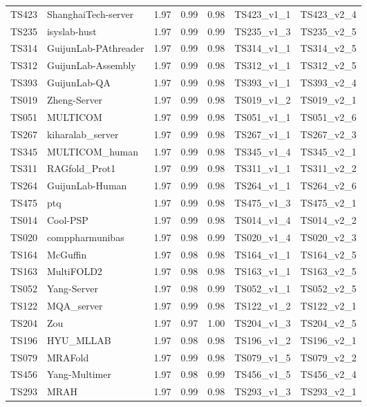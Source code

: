 \begin{table}[ht]
{\begin{tabular}{llrrrll}
TS423 & ShanghaiTech-server & 1.97 & 0.99 & 0.98 & TS423\_v1\_1 & TS423\_v2\_4 \\ 
TS235 & isyslab-hust & 1.97 & 0.99 & 0.99 & TS235\_v1\_3 & TS235\_v2\_5 \\ 
TS314 & GuijunLab-PAthreader & 1.97 & 0.99 & 0.98 & TS314\_v1\_1 & TS314\_v2\_5 \\ 
TS312 & GuijunLab-Assembly & 1.97 & 0.99 & 0.98 & TS312\_v1\_1 & TS312\_v2\_5 \\ 
TS393 & GuijunLab-QA & 1.97 & 0.99 & 0.98 & TS393\_v1\_1 & TS393\_v2\_4 \\ 
TS019 & Zheng-Server & 1.97 & 0.99 & 0.98 & TS019\_v1\_2 & TS019\_v2\_1 \\ 
TS051 & MULTICOM & 1.97 & 0.99 & 0.98 & TS051\_v1\_1 & TS051\_v2\_6 \\ 
TS267 & kiharalab\_server & 1.97 & 0.99 & 0.98 & TS267\_v1\_1 & TS267\_v2\_3 \\ 
TS345 & MULTICOM\_human & 1.97 & 0.99 & 0.98 & TS345\_v1\_4 & TS345\_v2\_1 \\ 
TS311 & RAGfold\_Prot1 & 1.97 & 0.99 & 0.98 & TS311\_v1\_1 & TS311\_v2\_2 \\ 
TS264 & GuijunLab-Human & 1.97 & 0.99 & 0.98 & TS264\_v1\_1 & TS264\_v2\_6 \\ 
TS475 & ptq & 1.97 & 0.99 & 0.98 & TS475\_v1\_3 & TS475\_v2\_1 \\ 
TS014 & Cool-PSP & 1.97 & 0.99 & 0.98 & TS014\_v1\_4 & TS014\_v2\_2 \\ 
TS020 & comppharmunibas & 1.97 & 0.98 & 0.99 & TS020\_v1\_4 & TS020\_v2\_3 \\ 
TS164 & McGuffin & 1.97 & 0.98 & 0.98 & TS164\_v1\_1 & TS164\_v2\_5 \\ 
TS163 & MultiFOLD2 & 1.97 & 0.98 & 0.98 & TS163\_v1\_1 & TS163\_v2\_5 \\ 
TS052 & Yang-Server & 1.97 & 0.98 & 0.99 & TS052\_v1\_1 & TS052\_v2\_5 \\ 
TS122 & MQA\_server & 1.97 & 0.99 & 0.98 & TS122\_v1\_2 & TS122\_v2\_1 \\ 
TS204 & Zou & 1.97 & 0.97 & 1.00 & TS204\_v1\_3 & TS204\_v2\_5 \\ 
TS196 & HYU\_MLLAB & 1.97 & 0.98 & 0.98 & TS196\_v1\_2 & TS196\_v2\_1 \\ 
TS079 & MRAFold & 1.97 & 0.99 & 0.98 & TS079\_v1\_5 & TS079\_v2\_2 \\ 
TS456 & Yang-Multimer & 1.97 & 0.98 & 0.99 & TS456\_v1\_5 & TS456\_v2\_4 \\ 
TS293 & MRAH & 1.97 & 0.99 & 0.98 & TS293\_v1\_3 & TS293\_v2\_1 \\ 

\end{tabular}}
\end{table}
